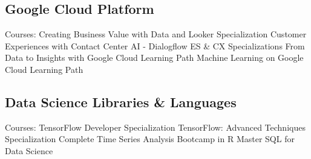 \documentclass[letterpaper]{deedy-resume_sm}
\begin{document}
\subsection{Google Cloud Platform}
Courses: Creating Business Value with Data and Looker Specialization \textbullet{} Customer Experiences with Contact Center AI - Dialogflow ES \& CX Specializations \textbullet{} From Data to Insights with Google Cloud Learning Path \textbullet{} Machine Learning on Google Cloud Learning Path

\subsection{Data Science Libraries \& Languages}
Courses: TensorFlow Developer Specialization \textbullet{} TensorFlow: Advanced Techniques Specialization \textbullet{} Complete Time Series Analysis Bootcamp in R \textbullet{} Master SQL for Data Science
\end{document}
